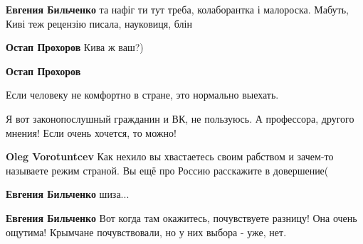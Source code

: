 \begin{itemize}
\begin{itemize}
\textbf{Евгения Бильченко} та нафіг ти тут треба, колаборантка і малороска. Мабуть, Киві теж рецензію писала, науковиця, блін

 
\textbf{Остап Прохоров} Кива ж ваш?)

 
\textbf{Остап Прохоров}

Если человеку не комфортно в стране, это нормально выехать.

Я вот законопослушный гражданин и ВК, не пользуюсь. А профессора, другого
мнения! Если очень хочется, то можно!

 
\textbf{Oleg Vorotuntcev} Как нехило вы хвастаетесь своим рабством и зачем-то называете режим страной. Вы ещё про Россию расскажите в довершение(

 
\textbf{Евгения Бильченко} шиза...

 
\textbf{Евгения Бильченко}
Вот когда там окажитесь, почувствуете разницу! Она очень ощутима! Крымчане почувствовали, но у них выбора - уже, нет.

 

\end{itemize}
\end{itemize}
